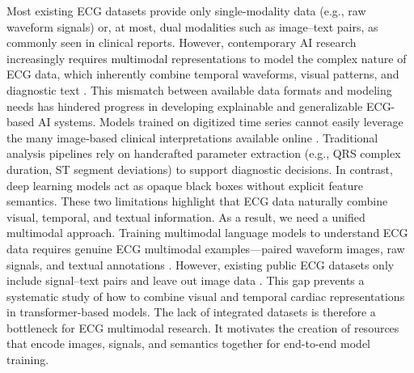 \documentclass[12pt,letterpaper]{article}
\begin{document}
Most existing ECG datasets provide only single-modality data (e.g., raw waveform signals) or, at most, dual modalities such as image–text pairs, as commonly seen in clinical reports. However, contemporary AI research increasingly requires multimodal representations to model the complex nature of ECG data, which inherently combine temporal waveforms, visual patterns, and diagnostic text \cite{wagner2020ptb, gow2023mimic, kansal2025mc}. This mismatch between available data formats and modeling needs has hindered progress in developing explainable and generalizable ECG-based AI systems. Models trained on digitized time series cannot easily leverage the many image‐based clinical interpretations available online \cite{al2023machine, chen2024congenital}. Traditional analysis pipelines rely on handcrafted parameter extraction (e.g., QRS complex duration, ST segment deviations) to support diagnostic decisions\cite{fan2025detecting}. In contrast, deep learning models act as opaque black boxes without explicit feature semantics\cite{csahin2025unlocking}. These two limitations highlight that ECG data naturally combine visual, temporal, and textual information. As a result, we need a unified multimodal approach. Training multimodal language models to understand ECG data requires genuine ECG multimodal examples—paired waveform images, raw signals, and textual annotations \cite{li2024frozen, lai2025diffusets}. However, existing public ECG datasets only include signal–text pairs and leave out image data \cite{tsutsui2025shdb, zheng2020121}. This gap prevents a systematic study of how to combine visual and temporal cardiac representations in transformer-based models. The lack of integrated datasets is therefore a bottleneck for ECG multimodal research. It motivates the creation of resources that encode images, signals, and semantics together for end-to-end model training.
\end{document}
